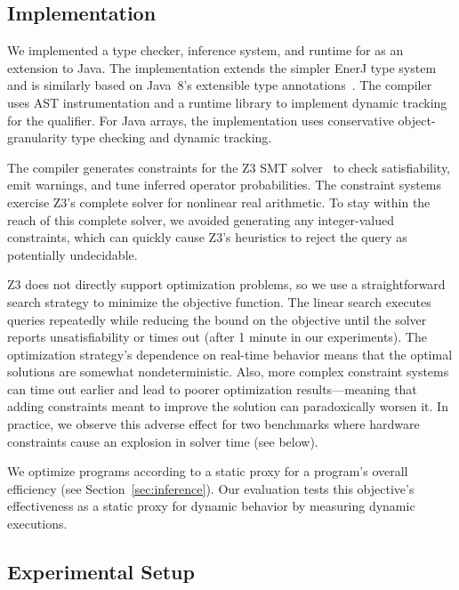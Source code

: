 {\subsection{Implementation}

We implemented a type checker, inference system, and runtime for \lang as an
extension to Java.
The implementation extends the simpler EnerJ type system~\cite{enerj} and is
similarly based on Java~8's extensible type annotations~\cite{jsr308}.
The compiler uses AST instrumentation and a runtime library to implement
dynamic tracking for the \Dyn qualifier.
For Java arrays, the implementation uses conservative object-granularity type
checking and dynamic tracking.

The compiler generates constraints for the Z3 SMT solver~\cite{z3} to check
satisfiability, emit warnings, and tune inferred operator probabilities.
The constraint systems exercise Z3's complete
solver for nonlinear real arithmetic.
To stay within the reach of this complete solver, we avoided generating any
integer-valued constraints, which can quickly cause Z3's heuristics to reject
the query as potentially undecidable.

Z3 does not directly support optimization problems, so
we use a straightforward search strategy to
minimize the objective function.
The linear search executes queries repeatedly while reducing the bound on the
objective until the solver reports unsatisfiability or times out (after 1
minute in our experiments).
The optimization strategy's dependence on real-time behavior means that the
optimal solutions are somewhat nondeterministic.
Also, more complex constraint systems can time out earlier and lead to
poorer optimization results---meaning that adding constraints meant
to improve the solution can paradoxically worsen it.
In practice, we observe this adverse effect for two benchmarks where hardware
constraints cause an explosion in solver time (see below).

We optimize programs according to a static proxy for a program's overall
efficiency (see Section~\ref{sec:inference}).
Our evaluation tests this objective's effectiveness as a static proxy for
dynamic behavior by measuring dynamic executions.

\subsection{Experimental Setup}

}
